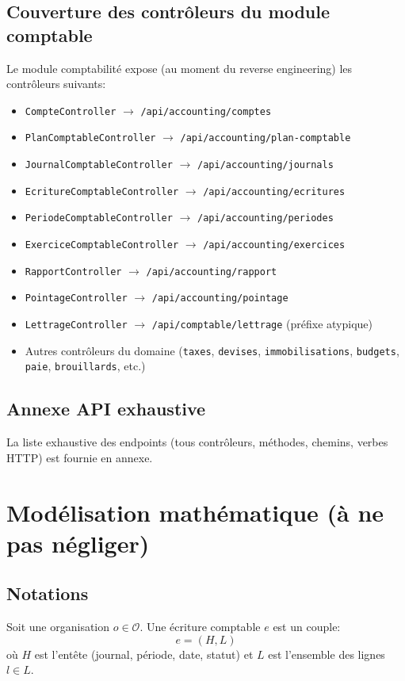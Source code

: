 \documentclass[12pt,a4paper]{report}
\begin{document}
\section{Couverture des contrôleurs du module comptable}
Le module comptabilité expose (au moment du reverse engineering) les contrôleurs suivants:
\begin{itemize}
  \item \texttt{CompteController} \(\rightarrow\) \texttt{/api/accounting/comptes}
  \item \texttt{PlanComptableController} \(\rightarrow\) \texttt{/api/accounting/plan-comptable}
  \item \texttt{JournalComptableController} \(\rightarrow\) \texttt{/api/accounting/journals}
  \item \texttt{EcritureComptableController} \(\rightarrow\) \texttt{/api/accounting/ecritures}
  \item \texttt{PeriodeComptableController} \(\rightarrow\) \texttt{/api/accounting/periodes}
  \item \texttt{ExerciceComptableController} \(\rightarrow\) \texttt{/api/accounting/exercices}
  \item \texttt{RapportController} \(\rightarrow\) \texttt{/api/accounting/rapport}
  \item \texttt{PointageController} \(\rightarrow\) \texttt{/api/accounting/pointage}
  \item \texttt{LettrageController} \(\rightarrow\) \texttt{/api/comptable/lettrage} (préfixe atypique)
  \item Autres contrôleurs du domaine (\texttt{taxes}, \texttt{devises}, \texttt{immobilisations}, \texttt{budgets}, \texttt{paie}, \texttt{brouillards}, etc.)
\end{itemize}

\section{Annexe API exhaustive}
La liste exhaustive des endpoints (tous contrôleurs, méthodes, chemins, verbes HTTP) est fournie en annexe.

\chapter{Modélisation mathématique (à ne pas négliger)}
\section{Notations}
Soit une organisation \(o \in \mathcal{O}\). Une écriture comptable \(e\) est un couple:
\[
e = (H, L)
\]
où \(H\) est l'entête (journal, période, date, statut) et \(L\) est l'ensemble des lignes \(l \in L\).
\end{document}
